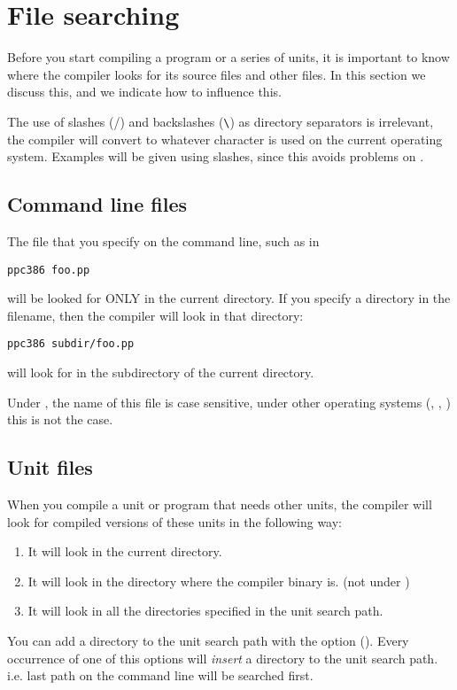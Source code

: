 \documentclass{book}
\begin{document}
\section{File searching}
Before you start compiling a program or a series of units, it is
important to know where the compiler looks for its source files and other
files. In this section we discuss this, and we indicate how to influence
this.

\begin{remark}
The use of slashes (/) and backslashes (\verb+\+) as directory separators
is irrelevant, the compiler will convert to whatever character is used on
the current operating system. Examples will be given using slashes, since
this avoids problems on \linux.
\end{remark}

\subsection{Command line files}
The file that you specify on the command line, such as in
\begin{verbatim}
ppc386 foo.pp
\end{verbatim}
will be looked for ONLY in the current directory. If you specify a directory
in the filename, then the compiler will look in that directory:
\begin{verbatim}
ppc386 subdir/foo.pp
\end{verbatim}
will look for  in the subdirectory  of the current
directory.

Under \linux, the name of this file is case sensitive, under other operating
systems (\dos, \windowsnt, \ostwo) this is not the case.

\subsection{Unit files}

When you compile a unit or program that needs other units, the compiler will
look for compiled versions of these units in the following way:
\begin{enumerate}
\item It will look in the current directory.
\item It will look in the directory where the compiler binary is.
(not under \linux)
\item It will look in all the directories specified in the unit search path.
\end{enumerate}
You can add a directory to the unit search path with the  option
(). Every occurrence of one of this options will {\em insert}
a directory to the unit search path. i.e. last path on the command line
will be searched first.
\end{document}
